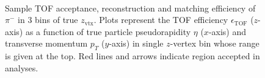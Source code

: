 \begin{figure}[H]
{\begin{subfigure}[b]{\linewidth}
		\end{subfigure}
	}%
	\quad%
	\parbox{0.485\textwidth}{
		\centering
		\begin{subfigure}[b]{\linewidth}\addtocounter{subfigure}{-2}
		\end{subfigure}\\[5pt]
		\begin{minipage}[t][0.78\linewidth][t]{\linewidth}\vspace{10pt}
			\caption[Sample plotz of TOF acceptance, reconstruction and matching efficiency of $\pi^{-}$.]{Sample TOF acceptance, reconstruction and matching efficiency of $\pi^{-}$ in 3 bins of true $z_{\text{vtx}}$. Plots represent the TOF efficiency $\epsilon_{\text{TOF}}$ ($z$-axis) as a function of true particle pseudorapidity $\eta$ ($x$-axis) and transverse momentum $p_{T}$ ($y$-axis) in single $z$-vertex bin whose range is given at the top. Red lines and arrows indicate region accepted in analyses.}\label{fig:tofEff_pion_sample}
		\end{minipage}
	}
\end{figure}



